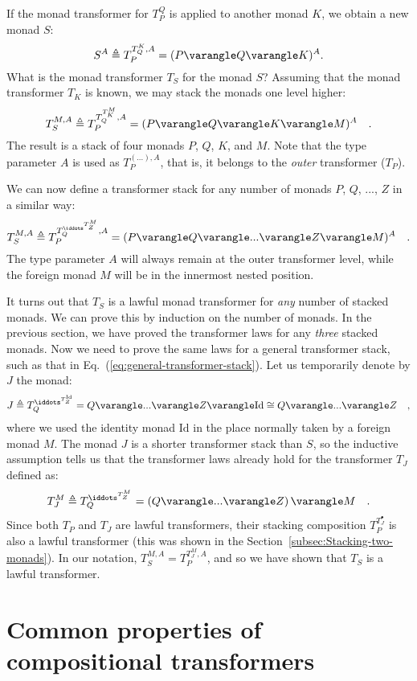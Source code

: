 If the monad transformer for $T_{P}^{Q}$ is applied to another monad
$K$, we obtain a new monad $S$:
\[
S^{A}\triangleq T_{P}^{T_{Q}^{K},A}=(P\varangle Q\varangle K)^{A}.
\]
What is the monad transformer $T_{S}$ for the monad $S$? Assuming
that the monad transformer $T_{K}$ is known, we may stack the monads
one level higher:
\[
T_{S}^{M,A}\triangleq T_{P}^{T_{Q}^{T_{K}^{M}},A}=(P\varangle Q\varangle K\varangle M)^{A}\quad.
\]
The result is a stack of four monads $P$, $Q$, $K$, and $M$. Note
that the type parameter $A$ is used as $T_{P}^{(...),A}$, that is,
it belongs to the \emph{outer} transformer ($T_{P}$).

We can now define a transformer stack for any number of monads $P$,
$Q$, ..., $Z$ in a similar way:
\begin{equation}
T_{S}^{M,A}\triangleq T_{P}^{T_{Q}^{\iddots^{T_{Z}^{M}}},A}=(P\varangle Q\varangle...\varangle Z\varangle M)^{A}\quad.\label{eq:general-transformer-stack}
\end{equation}
The type parameter $A$ will always remain at the outer transformer
level, while the foreign monad $M$ will be in the innermost nested
position.

It turns out that $T_{S}$ is a lawful monad transformer for \emph{any}
number of stacked monads. We can prove this by induction on the number
of monads. In the previous section, we have proved the transformer
laws for any \emph{three} stacked monads. Now we need to prove the
same laws for a general transformer stack, such as that in Eq.~(\ref{eq:general-transformer-stack}).
Let us temporarily denote by $J$ the monad:
\[
J\triangleq T_{Q}^{\iddots^{T_{Z}^{\text{Id}}}}=Q\varangle...\varangle Z\varangle\text{Id}\cong Q\varangle...\varangle Z\quad,
\]
where we used the identity monad $\text{Id}$ in the place normally
taken by a foreign monad $M$. The monad $J$ is a shorter transformer
stack than $S$, so the inductive assumption tells us that the transformer
laws already hold for the transformer $T_{J}$ defined as:
\[
T_{J}^{M}\triangleq T_{Q}^{\iddots^{T_{Z}^{M}}}=\left(Q\varangle...\varangle Z\right)\varangle M\quad.
\]
Since both $T_{P}$ and $T_{J}$ are lawful transformers, their stacking
composition $T_{P}^{T_{J}^{\bullet}}$ is also a lawful transformer
(this was shown in the Section~\ref{subsec:Stacking-two-monads}).
In our notation, $T_{S}^{M,A}=T_{P}^{T_{J}^{M},A}$, and so we have
shown that $T_{S}$ is a lawful transformer.

\section{Common properties of compositional transformers \label{sec:Monad-transformers-that-use-composition}}

